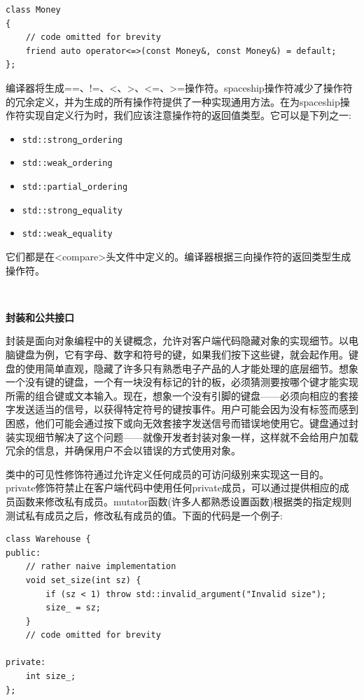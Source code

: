 \begin{lstlisting}[caption={}]
class Money
{
	// code omitted for brevity
	friend auto operator<=>(const Money&, const Money&) = default;
};
\end{lstlisting}

编译器将生成==、!=、<、>、<=、>=操作符。spaceship操作符减少了操作符的冗余定义，并为生成的所有操作符提供了一种实现通用方法。在为spaceship操作符实现自定义行为时，我们应该注意操作符的返回值类型。它可以是下列之一: \par

\begin{itemize}
	\item \texttt{std::strong\underline{ }ordering}
	\item \texttt{std::weak\underline{ }ordering}
	\item \texttt{std::partial\underline{ }ordering}
	\item \texttt{std::strong\underline{ }equality}
	\item \texttt{std::weak\underline{ }equality}
\end{itemize}

它们都是在<compare>头文件中定义的。编译器根据三向操作符的返回类型生成操作符。\par

\noindent\textbf{}\ \par
\textbf{封装和公共接口} \ \par
封装是面向对象编程中的关键概念，允许对客户端代码隐藏对象的实现细节。以电脑键盘为例，它有字母、数字和符号的键，如果我们按下这些键，就会起作用。键盘的使用简单直观，隐藏了许多只有熟悉电子产品的人才能处理的底层细节。想象一个没有键的键盘，一个有一块没有标记的针的板，必须猜测要按哪个键才能实现所需的组合键或文本输入。现在，想象一个没有引脚的键盘——必须向相应的套接字发送适当的信号，以获得特定符号的键按事件。用户可能会因为没有标签而感到困惑，他们可能会通过按下或向无效套接字发送信号而错误地使用它。键盘通过封装实现细节解决了这个问题——就像开发者封装对象一样，这样就不会给用户加载冗余的信息，并确保用户不会以错误的方式使用对象。 \par
类中的可见性修饰符通过允许定义任何成员的可访问级别来实现这一目的。private修饰符禁止在客户端代码中使用任何private成员，可以通过提供相应的成员函数来修改私有成员。mutator函数(许多人都熟悉设置函数)根据类的指定规则测试私有成员之后，修改私有成员的值。下面的代码是一个例子: \par

\begin{lstlisting}[caption={}]
class Warehouse {
public:
	// rather naive implementation
	void set_size(int sz) {
		if (sz < 1) throw std::invalid_argument("Invalid size");
		size_ = sz;
	}
	// code omitted for brevity
	
private:
	int size_;
};
\end{lstlisting}

